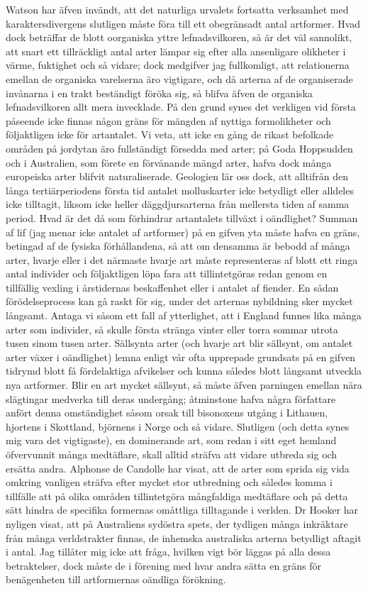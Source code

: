 Watson har äfven invändt, att det naturliga urvalets fortsatta verksamhet med karaktersdivergens slutligen måste föra till ett obegränsadt antal artformer. Hvad dock beträffar de blott oorganiska yttre lefnadsvilkoren, så är det väl sannolikt, att snart ett tillräckligt antal arter lämpar sig efter alla ansenligare olikheter i värme, fuktighet och så vidare; dock medgifver jag fullkomligt, att relationerna emellan de organiska varelserna äro vigtigare, och då arterna af de organiserade invånarna i en trakt beständigt föröka sig, så blifva äfven de organiska lefnadsvilkoren allt mera invecklade. På den grund synes det verkligen vid första påseende icke finnas någon gräns för mängden af nyttiga formolikheter och följaktligen icke för artantalet. Vi veta, att icke en gång de rikast befolkade områden på jordytan äro fullständigt försedda med arter; på Goda Hoppsudden och i Australien, som förete en förvånande mängd arter, hafva dock många europeiska arter blifvit naturaliserade. Geologien lär oss dock, att alltifrån den långa tertiärperiodens första tid antalet molluskarter icke betydligt eller alldeles icke tilltagit, liksom icke heller däggdjursarterna från mellersta tiden af samma period. Hvad är det då som förhindrar artantalets tillväxt i oändlighet? Summan af lif (jag menar icke antalet af artformer) på en gifven yta måste hafva en gräns, betingad af de fysiska förhållandena, så att om densamma är bebodd af många arter, hvarje eller i det närmaste hvarje art måste representeras af blott ett ringa antal individer och följaktligen löpa fara att tillintetgöras redan genom en tillfällig vexling i årstidernas beskaffenhet eller i antalet af fiender. En sådan förödelseprocess kan gå raskt för sig, under det arternas nybildning sker mycket långsamt. Antaga vi såsom ett fall af ytterlighet, att i England funnes lika många arter som individer, så skulle första stränga vinter eller torra sommar utrota tusen sinom tusen arter. Sällsynta arter (och hvarje art blir sällsynt, om antalet arter växer i oändlighet) lemna enligt vår ofta upprepade grundsats på en gifven tidrymd blott få fördelaktiga afvikelser och kunna således blott långsamt utveckla nya artformer. Blir en art mycket sällsynt, så måste äfven parningen emellan nära slägtingar medverka till deras undergång; åtminstone hafva några författare anfört denna omständighet såsom orsak till bisonoxens utgång i Lithauen, hjortens i Skottland, björnens i Norge och så vidare. Slutligen (och detta synes mig vara det vigtigaste), en dominerande art, som redan i sitt eget hemland öfvervunnit många medtäflare, skall alltid sträfva att vidare utbreda sig och ersätta andra. Alphonse de Candolle har visat, att de arter som sprida sig vida omkring vanligen sträfva efter mycket stor utbredning och således komma i tillfälle att på olika områden tillintetgöra mångfaldiga medtäflare och på detta sätt hindra de specifika formernas omåttliga tilltagande i verlden. Dr Hooker har nyligen visat, att på Australiens sydöstra spets, der tydligen många inkräktare från många verldstrakter finnas, de inhemska australiska arterna betydligt aftagit i antal. Jag tillåter mig icke att fråga, hvilken vigt bör läggas på alla dessa betraktelser, dock måste de i förening med hvar andra sätta en gräns för benägenheten till artformernas oändliga förökning.
